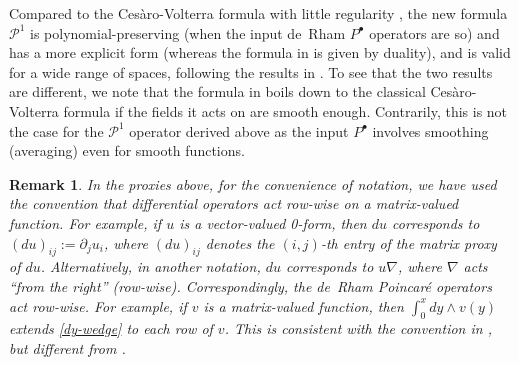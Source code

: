\documentclass[11pt]{amsart}
\newtheorem{remark}{Remark}
\newcommand{\0}{\mathaccent23}
\newcommand{\bs}{{\scriptscriptstyle \bullet}}
\begin{document}
 
 Compared to the Ces\`aro-Volterra formula with little regularity  \cite{ciarlet2010cesaro}, the new formula $\mathscr{P}^{1}$ is polynomial-preserving (when the input de~Rham $P^{\bs}$ operators are so) and has a more explicit form (whereas the formula in \cite{ciarlet2010cesaro} is given by duality), and is valid for a wide range of spaces, following the results in \cite{costabel2010bogovskiui}. To see that the two results are different, we note that the formula in \cite{ciarlet2010cesaro} boils down to the classical Ces\`aro-Volterra formula if the fields it acts on are smooth enough. Contrarily, this is not the case for the $\mathscr{P}^{1}$ operator derived above as the input $P^{\bs}$ involves smoothing (averaging) even for smooth functions. 

\begin{remark}
In the proxies above, for the convenience of notation, we have used the convention that differential operators act row-wise on a matrix-valued function. For example, if $u$ is a vector-valued 0-form, then $du$ corresponds to $(du)_{ij}:=\partial_{j}u_{i}$, where $(du)_{ij}$ denotes the $(i, j)$-th entry of the matrix proxy of $du$. Alternatively, in another notation, $du$ corresponds to $u\nabla$, where $\nabla$ acts ``from the right'' (row-wise).  Correspondingly, the de~Rham Poincar\'e operators act row-wise. For example, if $v$ is a matrix-valued function, then $\int_{0}^{x}dy\wedge v(y)$ extends  \eqref{dy-wedge} to  each row of $v$. This is consistent with the convention in \cite{christiansen2020poincare}, but different from \cite{arnold2021complexes,vcap2022bgg}.
\end{remark}

 \medskip
 
\end{document}
